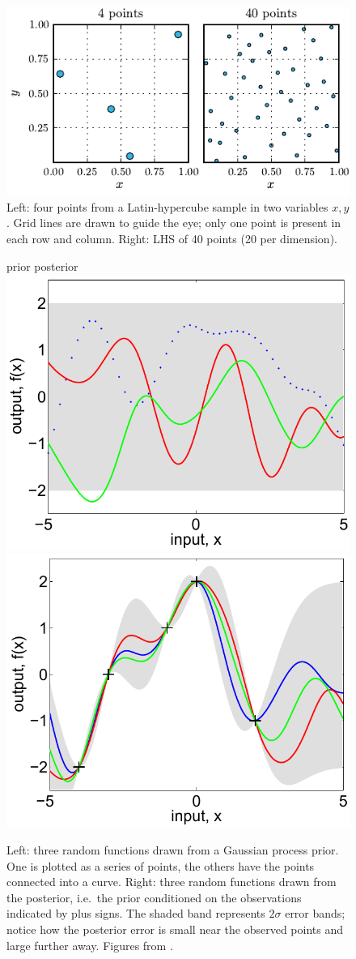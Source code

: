 \documentclass[reprint,amsmath]{revtex4-1}
\begin{document}
\begin{figure}[b]
  \centering
  \includegraphics{lhs}
  \caption{Left:  four points from a Latin-hypercube sample in two variables $x,y$.  Grid lines are drawn to guide the eye;
  only one point is present in each row and column.  Right:  LHS of 40 points (20 per dimension).}
  \label{fig:lhs}
\end{figure}

\begin{figure}[b]
  \centering
  \small
  \hspace{.65cm} prior \hspace{3.2cm} posterior \\
  \includegraphics[width=.49\columnwidth]{gpr1} 
  \includegraphics[width=.49\columnwidth]{gpr2}
  \caption{Left:  three random functions drawn from a Gaussian process prior.  One is plotted as a series of points, the others have the
    points connected into a curve.  Right:  three random functions drawn from the posterior, i.e.\ the prior conditioned on the observations
    indicated by plus signs.  The shaded band represents $2\sigma$ error bands; notice how the posterior error is small near the observed
    points and large further away.  Figures from \cite{rasmussen}.}
  \label{fig:emu}
\end{figure}
\end{document}
